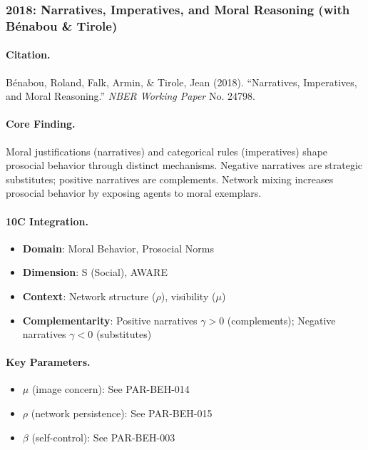 \subsubsection{2018: Narratives, Imperatives, and Moral Reasoning (with Bénabou \& Tirole)}

\paragraph{Citation.}
Bénabou, Roland, Falk, Armin, \& Tirole, Jean (2018). ``Narratives, Imperatives, and Moral Reasoning.''
\textit{NBER Working Paper} No. 24798.

\paragraph{Core Finding.}
Moral justifications (narratives) and categorical rules (imperatives) shape prosocial behavior through
distinct mechanisms. Negative narratives are strategic substitutes; positive narratives are complements.
Network mixing increases prosocial behavior by exposing agents to moral exemplars.

\paragraph{10C Integration.}
\begin{itemize}[nosep]
  \item \textbf{Domain}: Moral Behavior, Prosocial Norms
  \item \textbf{Dimension}: S (Social), AWARE
  \item \textbf{Context}: Network structure ($\rho$), visibility ($\mu$)
  \item \textbf{Complementarity}: Positive narratives $\gamma > 0$ (complements); Negative narratives $\gamma < 0$ (substitutes)
\end{itemize}

\paragraph{Key Parameters.}
\begin{itemize}[nosep]
  \item $\mu$ (image concern): See PAR-BEH-014
  \item $\rho$ (network persistence): See PAR-BEH-015
  \item $\beta$ (self-control): See PAR-BEH-003
\end{itemize}

